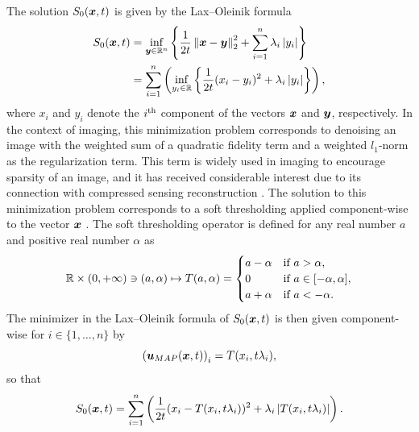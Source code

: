 \begin{example}
The solution $S_0(\boldsymbol{x},t)$ is given by the Lax--Oleinik formula
\begin{align*}
S_{0}(\boldsymbol{x},t) & =\inf_{\boldsymbol{y}\in\mathbb{R}^n}\left\{ \frac{1}{2t}\left\Vert \boldsymbol{x}-\boldsymbol{y}\right\Vert _{2}^{2}+\sum_{i=1}^{n}\lambda_{i}\left|y_{i}\right|\right\} \label{eq:ex_sol_eps_0}\\
 & =\sum_{i=1}^{n}\left(\inf_{y_{i}\in\mathbb{R}}\left\{ \frac{1}{2t}(x_{i}-y_{i})^{2}+\lambda_{i}\left|y_{i}\right|\right\} \right),
\end{align*}
where $x_i$ and $y_i$ denote the $i^{\rm th}$ component of the vectors $\boldsymbol{x}$ and $\boldsymbol{y}$, respectively. In the context of imaging, this minimization problem corresponds to denoising an image with the weighted sum of a quadratic fidelity term and a weighted $l_{1}$-norm as the regularization term. This term is widely used in imaging to encourage sparsity of an image, and it has received considerable interest due to its connection with compressed sensing reconstruction \citep{candes2006robust,donoho2006compressed}. The solution to this minimization problem corresponds to a soft thresholding applied component-wise to the vector $\boldsymbol{x}$ \cite{daubechies2004iterative, figueiredo2001wavelet,lions1979splitting}. The soft thresholding operator is defined for any real number $a$ and positive real number $\alpha$ as
\begin{equation} \label{eq:thresholding_operator}
\mathbb{R} \times (0,+\infty) \ni (a,\alpha) \mapsto T(a,\alpha)=\begin{cases}
a-\alpha & \mbox{if }a>\alpha,\\
0 & \mbox{if }a\in[-\alpha,\alpha],\\
a+\alpha & \mbox{if }a<-\alpha.
\end{cases}
\end{equation}
The minimizer in the Lax--Oleinik formula of $S_0(\boldsymbol{x},t)$ is then given component-wise for $i\in\{1,\dots,n\}$ by
\[
\left(\boldsymbol{u}_{MAP}(\boldsymbol{x},t)\right)_{i}=T(x_{i},t\lambda_{i}),
\]
so that
\begin{equation*}
S_{0}(\boldsymbol{x},t) = \sum_{i=1}^{n}\left( \frac{1}{2t}(x_{i}-T(x_{i},t\lambda_{i}))^{2}+\lambda_{i}\left|T(x_{i},t\lambda_{i})\right|\right).
\end{equation*}


\end{example}
